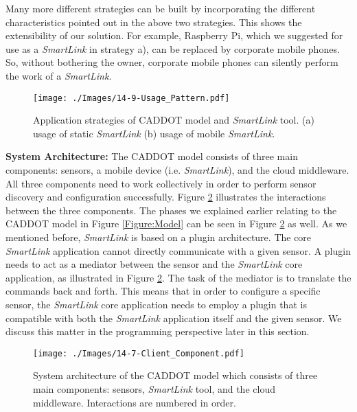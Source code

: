 \documentclass[graybox]{svmult}
\begin{document}
Many more different strategies can be built by incorporating the different characteristics pointed out in the above two strategies. This shows the extensibility of our solution. For example, Raspberry Pi, which we suggested for use as a \textit{SmartLink} in strategy a), can be replaced by corporate mobile phones. So, without bothering the owner, corporate mobile phones can silently perform the work of a \textit{SmartLink}.


\begin{figure}[t]
 \centering
\texttt{[image: ./Images/14-9-Usage\_Pattern.pdf]}
\caption{Application strategies of CADDOT model and \textit{SmartLink} tool. (a) usage of static \textit{SmartLink} (b) usage of mobile \textit{SmartLink}.}
 \label{Figure:Usage_Pattern}
\end{figure}



\textbf{System Architecture:} The CADDOT model consists of three main components: sensors, a mobile device (i.e. \textit{SmartLink}), and the cloud middleware. All three components need to work collectively in order to perform sensor discovery and configuration successfully. Figure  \ref{Figure:System} illustrates the interactions between the three components. The phases we explained earlier relating to the CADDOT model in Figure \ref{Figure:Model} can be seen in Figure \ref{Figure:System} as well. As we mentioned before, \textit{SmartLink} is based on a plugin architecture. The core \textit{SmartLink} application cannot directly communicate with a given sensor. A plugin needs to act as a mediator between the sensor and the \textit{SmartLink} core application, as illustrated in Figure \ref{Figure:System}. The task of the mediator is to translate the commands back and forth. This means that in order to configure a specific sensor, the \textit{SmartLink} core application needs to employ a plugin that is compatible with both the \textit{SmartLink} application itself and the given sensor. We discuss this matter in the programming perspective later in this section.






\begin{figure}[t!]
 \centering
\texttt{[image: ./Images/14-7-Client\_Component.pdf]}
\caption{System architecture of the CADDOT model which consists of three main components: sensors, \textit{SmartLink} tool, and the cloud middleware. Interactions are numbered in order.}
 \label{Figure:System}	
\vspace{-0.33cm}	
\end{figure}
\end{document}
